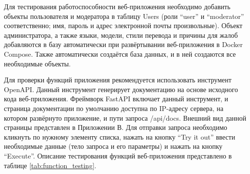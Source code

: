 \clearpage
{}

Для тестирования работоспособности веб-приложения необходимо добавить объекты пользователя и модератора в таблицу Users (роли “user” и “moderator” соответственно; имя, пароль и адрес электронной почты произвольные). Объект администратора, а также языки, модели, стили перевода и причины для жалоб добавляются в базу автоматически при развёртывании веб-приложения в Docker Compose. Также автоматически создаётся база данных, и в ней создаются все необходимые объекты.

Для проверки функций приложения рекомендуется использовать инструмент OpenAPI. Данный инструмент генерирует документацию на основе исходного кода веб-приложения. Фреймворк FastAPI включает данный инструмент, и страница документации по умолчанию доступна по IP-адресу сервера, на котором развёрнуто приложение, и пути запроса /api/docs. Внешний вид данной страницы представлен в Приложении В. Для отправки запроса необходимо кликнуть по нужному элементу списка, нажать на кнопку “Try it out” ввести необходимые данные (тело запроса и его параметры) и нажать на кнопку “Execute”. Описание тестирования функций веб-приложения представлено в таблице \ref{tab:function_testing}.

